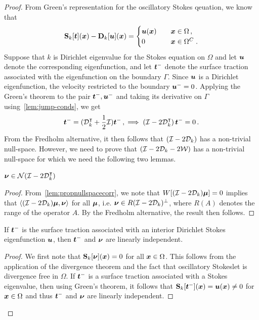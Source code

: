 \begin{proof}
From Green's representation for the oscillatory Stokes qeuation, 
we know that 
  \begin{equation} \label{eq:rep-theorem}
    {\bf S}_{k} [{\boldsymbol t}]({\boldsymbol x}) - {\bf D}_{k}[{\boldsymbol u}]({\boldsymbol x}) = \begin{cases} 
    {\boldsymbol u}({\boldsymbol x}) &\quad {\boldsymbol x} \in \Omega \, , \\
    0 &\quad {\boldsymbol x} \in \Omega^{C} \; .
    \end{cases}
  \end{equation}
Suppose that $k$ is Dirichlet eigenvalue for the Stokes equation on $\Omega$
and let ${\boldsymbol u}$ denote the corresponding eigenfunction, and let ${\boldsymbol t}^{-}$ denote
the surface traction associated with the eigenfunction on the boundary $\Gamma$.
Since ${\boldsymbol u}$ is a Dirichlet eigenfunction, the velocity restricted to the boundary
${\boldsymbol u}^{-} = 0$. 
Applying the Green's theorem to the pair ${\boldsymbol t}^{-}, {\boldsymbol u}^{-}$ and taking 
its derivative on $\Gamma$ using~\cref{lem:jump-conds}, we get
\begin{equation}
{\boldsymbol t}^{-} = ({\mathcal D}^{\intercal}_{k} + \frac{1}{2} \mathcal I) {\boldsymbol t}^{-} \, ,\implies \left(\mathcal I - 2{\mathcal D}^{\intercal}_{k} \right) 
{\boldsymbol t}^{-} = 0 \, .
\end{equation}
From the Fredholm alternative, it then follows that $(\mathcal I - 2{\mathcal D}_{k})$ has a non-trivial 
null-space.
However, we need to prove that $(\mathcal I -2{\mathcal D}_{k} - 2{\mathcal W})$ has a non-trivial null-space
for which we need the following two lemmas.


\begin{lemma}
${\boldsymbol \nu} \in {\mathcal N}(\mathcal I - 2{\mathcal D}^{\intercal}_{k})$
\end{lemma}
\begin{proof}
From~\cref{lem:propnullspacecorr}, we note that
$W[(\mathcal I - 2{\mathcal D}_{k}){\boldsymbol \mu}] =0$ implies that $\left<(\mathcal I -2{\mathcal D}_{k}){\boldsymbol \mu} ,{\boldsymbol \nu} \right>$ for
all ${\boldsymbol \mu}$, i.e. ${\boldsymbol \nu} \in R(\mathcal I - 2{\mathcal D}_{k})^{\perp}$, where
$R(A)$ denotes the range of the operator $A$. 
By the Fredholm alternative, the result then follows.
\end{proof}

\begin{lemma}
If ${\boldsymbol t}^{-}$ is the surface traction associated with an interior Dirichlet
Stokes eigenfunction ${\boldsymbol u}$, then ${\boldsymbol t}^{-}$ and ${\boldsymbol \nu}$ are linearly independent.
\end{lemma}
\begin{proof}
We first note that ${\bf S}_{k}[{\boldsymbol \nu}]({\boldsymbol x}) = 0$ for all ${\boldsymbol x} \in \Omega$.
This follows from the application of the divergence theorem and the fact that
oscillatory Stokeslet is divergence free in $\Omega$. 
If ${\boldsymbol t}^{-}$ is a surface traction associated with a Stokes eigenvalue, then
using Green's theorem, it follows that
${\bf S}_{k}[{\boldsymbol t}^{-}]({\boldsymbol x}) = {\boldsymbol u}({\boldsymbol x}) \neq 0$ for ${\boldsymbol x} \in \Omega$ and
thus ${\boldsymbol t}^{-}$ and ${\boldsymbol \nu}$ are linearly independent.
\end{proof}



\end{proof}
